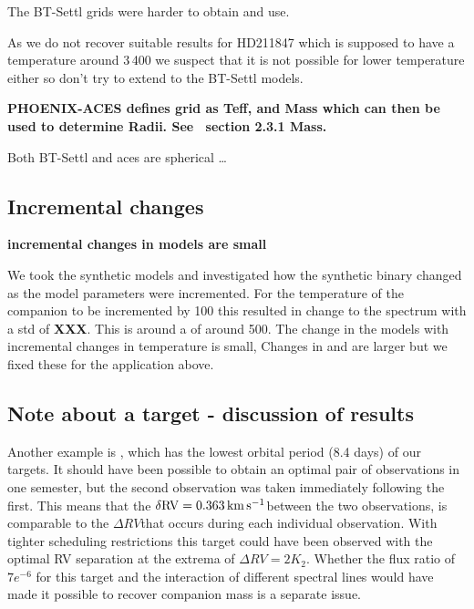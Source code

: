 The {BT-Settl} grids were harder to obtain and use.

As we do not recover suitable results for HD211847 which is supposed to have a temperature around 3\,400\K{} we suspect that it is not possible for lower temperature either so don't try to extend to the {BT-Settl} models.


\textbf{
     {PHOENIX-ACES}  defines grid as Teff,\logg{} and Mass which can then be used to determine Radii.
See~\citep{husser_new_2013} section 2.3.1 Mass.}

Both {BT-Settl} and aces are spherical
\ldots{}




\subsection{Incremental changes}
\textbf{incremental changes in models are small}

We took the synthetic models and investigated how the synthetic binary changed as the model parameters were incremented. For the temperature of the companion to be incremented by 100\K{} this resulted in change to the spectrum with a std of \textbf{XXX}.
This is around a \snr{} of around 500.
The change in the models with incremental changes in temperature is small, Changes in \logg{} and \feh{} are larger but we fixed these for the application above.





\subsection{Note about a target - discussion of results}
Another example is , which has the lowest orbital period (8.4 days) of our targets.
It should have been possible to obtain an optimal pair of observations in one semester, but the second observation was taken immediately following the first.
This means that the \(\rm \delta {RV} = 0.363\,\si{\kilo\meter\per\second}{}\)between the two observations, is comparable to the \(\Delta {RV}\)that occurs during each individual observation.
With tighter scheduling restrictions this target could have been observed with the optimal {RV} separation at the extrema of \(\Delta {RV}=2 K_{2}\).
Whether the flux ratio of \(7e^{-6}\) for this target and the interaction of different spectral lines would have made it possible to recover companion mass is a separate issue.



